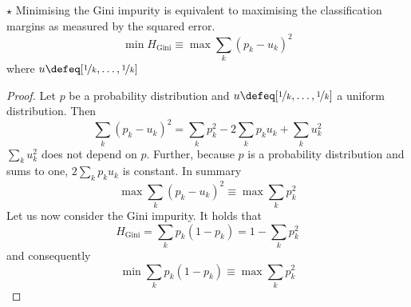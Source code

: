 \documentclass[
	twoside=false, %
]{kaobook}
\begin{document}
\begin{proposition} $\star$
Minimising the Gini impurity is equivalent to maximising the classification margins as measured by the squared error.
$$
\min H_{\text{Gini} } \equiv \max \sum_{k} (p_{k} - u_{k}) ^2
$$
where $u \defeq [ \nicefrac{1}{k}, \dots, \nicefrac{1}{k}]$
\end{proposition}

\begin{proof}
Let $p$ be a probability distribution and $u \defeq [ \nicefrac{1}{k}, \dots, \nicefrac{1}{k}]$ a uniform distribution. Then
$$
\sum_{k} (p_{k} - u_{k})^2 = \sum_{k} p_{k}^2 - 2\sum_{k}p_{k}u_{k} + \sum_{k} u_{k}^2
$$
$\sum_{k} u_{k}^2$ does not depend on $p$. Further, because $p$ is a probability distribution and sums to one, $2 \sum_{k}p_{k}u_{k}$ is constant. In summary
$$
\max \sum_{k}(p_{k} - u_{k})^2 \equiv \max \sum_{k}p_{k}^2
$$
Let us now consider the Gini impurity. It holds that
$$
H_{\text{Gini} } = \sum_{k} p_{k}(1-p_{k}) = 1 - \sum_{k}p_{k}^2
$$
and consequently
$$
\min \sum_{k} p_{k}(1-p_{k}) \equiv \max \sum_{k} p_{k}^2
$$
\end{proof}

\end{document}
